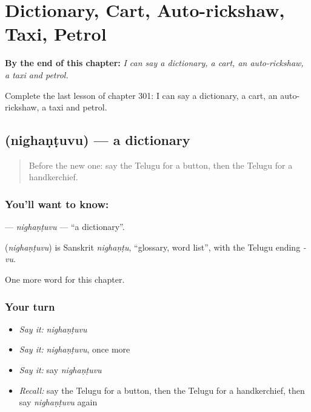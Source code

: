 
\chapter{Dictionary, Cart, Auto-rickshaw, Taxi, Petrol}
\label{ch:te-dictionary-cart-auto-rickshaw-taxi-petrol}

\begin{chapteropening}
\textbf{By the end of this chapter:} \emph{I can say a dictionary, a cart, an auto-rickshaw, a taxi and petrol.}

Complete the last lesson of chapter 301: I can say a dictionary, a cart, an auto-rickshaw, a taxi and petrol.
\end{chapteropening}

\section[\texorpdfstring{\te{నిఘంటువు} (nighaṇṭuvu)}{నిఘంటువు (nighaṇṭuvu)}]{ (nighaṇṭuvu) — a dictionary}

\label{lesson:TE-C301-nighantuvu}



\begin{quote}
Before the new one: say the Telugu for a button, then the Telugu for a handkerchief.
\end{quote}

\subsection*{You'll want to know: }
\textbf{} — \emph{nighaṇṭuvu} — \textquotedblleft{}a dictionary\textquotedblright{}.

\begin{cousinweb}
\textbf{} (\emph{nighaṇṭuvu}) is Sanskrit \emph{nighaṇṭu}, \textquotedblleft{}glossary, word list\textquotedblright{}, with the Telugu ending \emph{-vu}.
\end{cousinweb}

\begin{grammarlens}[title={What you've built}]
One more word for this chapter.
\end{grammarlens}

\subsection*{Your turn}
\begin{itemize}
\raggedright
  \item \emph{Say it:} \emph{nighaṇṭuvu}
  \item \emph{Say it:} \emph{nighaṇṭuvu}, once more
  \item \emph{Say it:} say \emph{nighaṇṭuvu}
  \item \emph{Recall:} say the Telugu for a button, then the Telugu for a handkerchief, then say \emph{nighaṇṭuvu} again
\end{itemize}

